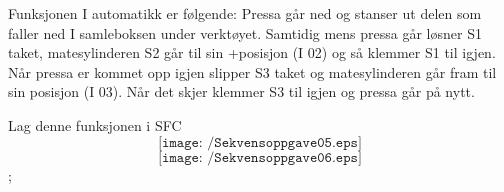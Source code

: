 Funksjonen I automatikk er følgende: Pressa går ned og stanser ut delen som faller ned I samleboksen under verktøyet. Samtidig mens pressa går løsner S1 taket, matesylinderen S2 går til sin +posisjon (I 02) og så klemmer S1 til igjen. Når pressa er kommet opp igjen slipper S3 taket og matesylinderen går fram til sin \textendash posisjon (I 03). Når det skjer klemmer S3 til igjen og pressa går på nytt. 
\vskip 5pt 

Lag denne funksjonen i SFC
\vskip 5pt 
$$\texttt{[image: /Sekvensoppgave05.eps]}$$
$$\texttt{[image: /Sekvensoppgave06.eps]}$$;



\vskip 5pt 


